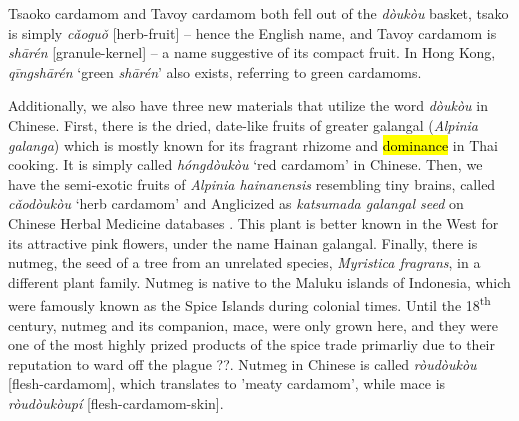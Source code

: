 \documentclass[12pt]{article}
\newcommand{\tc}[1]{\traditionalchinesefont{#1}\rmfamily}
\begin{document}
Tsaoko cardamom and Tavoy cardamom both fell out of the \textit{dòukòu} basket, tsako is simply \textit{cǎoguǒ} [herb-fruit] -- hence the English name, and Tavoy cardamom is \textit{shārén} [granule-kernel] -- a name suggestive of its compact fruit. In Hong Kong, \tc{青砂仁} \textit{qīngshā​rén} `green \textit{shārén}' also exists, referring to green cardamoms.


Additionally, we also have three new materials that utilize the word \textit{dòukòu} in Chinese. First, there is the dried, date-like fruits of greater galangal (\textit{Alpinia galanga}) which is mostly known for its fragrant rhizome and \hl{dominance} in Thai cooking. It is simply called \textit{hóngdòukòu} `red cardamom' in Chinese. Then, we have the semi-exotic fruits of \textit{Alpinia hainanensis} resembling tiny brains, called \textit{cǎodòukòu} `herb cardamom' and Anglicized as \textit{katsumada galangal seed} on Chinese Herbal Medicine databases \parencite[cf.][]{polyu_2022_chinese}. This plant is better known in the West for its attractive pink flowers, under the name Hainan galangal. Finally, there is nutmeg, the seed of a tree from an unrelated species, \textit{Myristica fragrans}, in a different plant family. Nutmeg is native to the Maluku islands of Indonesia, which were famously known as the Spice Islands during colonial times. Until the 18\textsuperscript{th} century, nutmeg and its companion, mace, were only grown here, and they were one of the most highly prized products of the spice trade primarliy due to their reputation to ward off the plague ??.
Nutmeg in Chinese is called \textit{ròudòukòu} [flesh-cardamom], which translates to 'meaty cardamom', while mace is \textit{ròudòukòupí}	[flesh-cardamom-skin].
\end{document}
